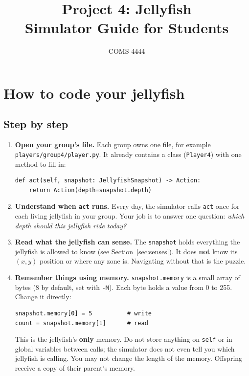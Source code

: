 \documentclass[11pt]{article}
\title{Project 4: Jellyfish\\[4pt] \large Simulator Guide for Students}
\author{COMS 4444}
\date{}
\begin{document}
\maketitle
\tableofcontents

\section{How to code your jellyfish}

\subsection{Step by step}

\begin{enumerate}[leftmargin=*]
  \item \textbf{Open your group's file.} Each group owns one file, for
  example \texttt{players/group4/player.py}. It already contains a class
  (\texttt{Player4}) with one method to fill in:
\begin{lstlisting}
def act(self, snapshot: JellyfishSnapshot) -> Action:
    return Action(depth=snapshot.depth)
\end{lstlisting}

  \item \textbf{Understand when \texttt{act} runs.} Every day, the
  simulator calls \texttt{act} once for each living jellyfish in your
  group. Your job is to answer one question: \emph{which depth should this
  jellyfish ride today?}

  \item \textbf{Read what the jellyfish can sense.} The \texttt{snapshot}
  holds everything the jellyfish is allowed to know (see
  Section~\ref{sec:senses}). It does \textbf{not} know its $(x, y)$
  position or where any zone is. Navigating without that is the puzzle.

  \item \textbf{Remember things using memory.}
  \texttt{snapshot.memory} is a small array of bytes (8 by default, set
  with \texttt{-M}). Each byte holds a value from 0 to 255. Change it
  directly:
\begin{lstlisting}
snapshot.memory[0] = 5          # write
count = snapshot.memory[1]      # read
\end{lstlisting}
  This is the jellyfish's \textbf{only} memory. Do not store anything on
  \texttt{self} or in global variables between calls; the simulator does
  not even tell you which jellyfish is calling. You may not change the
  length of the memory. Offspring receive a copy of their parent's memory.


\end{enumerate}
\end{document}
